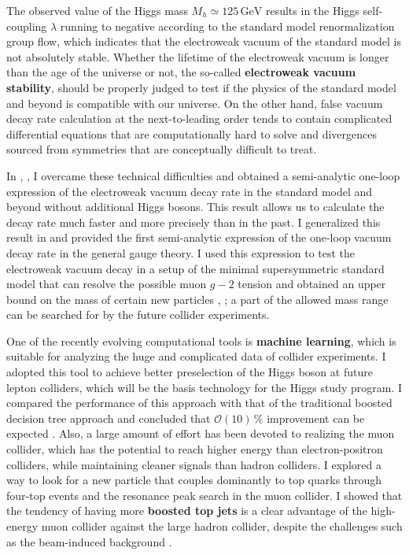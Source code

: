 \documentclass[12pt]{article}
\begin{document}
The observed value of the Higgs mass $M_h \simeq 125\,\mathrm{GeV}$ results in the Higgs self-coupling $\lambda$ running to negative according to the standard model renormalization group flow, which indicates that the electroweak vacuum of the standard model is not absolutely stable.
Whether the lifetime of the electroweak vacuum is longer than the age of the universe or not, the so-called \textbf{electroweak vacuum stability}, should be properly judged to test if the physics of the standard model and beyond is compatible with our universe.
On the other hand, false vacuum decay rate calculation at the next-to-leading order tends to contain complicated differential equations that are computationally hard to solve and divergences sourced from symmetries that are conceptually difficult to treat.

In \cite{Chigusa:2017dux}, \cite{Chigusa:2018uuj}, I overcame these technical difficulties and obtained a semi-analytic one-loop expression of the electroweak vacuum decay rate in the standard model and beyond without additional Higgs bosons.
This result allows us to calculate the decay rate much faster and more precisely than in the past.
I generalized this result in \cite{Chigusa:2020jbn} and provided the first semi-analytic expression of the one-loop vacuum decay rate in the general gauge theory.
I used this expression to test the electroweak vacuum decay in a setup of the minimal supersymmetric standard model that can resolve the possible muon $g-2$ tension and obtained an upper bound on the mass of certain new particles \cite{Chigusa:2022xpq}, \cite{Chigusa:2023mqy}; a part of the allowed mass range can be searched for by the future collider experiments.

One of the recently evolving computational tools is \textbf{machine learning}, which is suitable for analyzing the huge and complicated data of collider experiments.
I adopted this tool to achieve better preselection of the Higgs boson at future lepton colliders, which will be the basis technology for the Higgs study program.
I compared the performance of this approach with that of the traditional boosted decision tree approach and concluded that $\mathcal{O}(10)\,\%$ improvement can be expected \cite{Chigusa:2022svv}.
Also, a large amount of effort has been devoted to realizing the muon collider, which has the potential to reach higher energy than electron-positron colliders, while maintaining cleaner signals than hadron colliders.
I explored a way to look for a new particle that couples dominantly to top quarks through four-top events and the resonance peak search in the muon collider.
I showed that the tendency of having more \textbf{boosted top jets} is a clear advantage of the high-energy muon collider against the large hadron collider, despite the challenges such as the beam-induced background \cite{Chigusa:2023rrz}.
\end{document}
